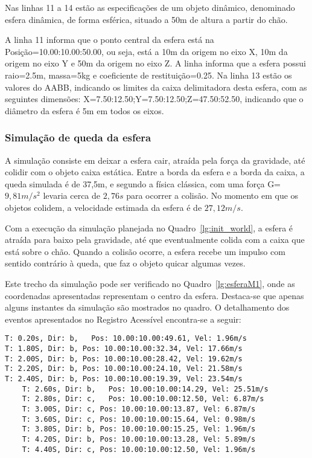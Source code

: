 \documentclass[12pt]{article}
\begin{document}
Nas linhas 11 a 14 estão as especificações de um objeto dinâmico, denominado esfera dinâmica, de forma esférica, situado a 50m de altura a partir do chão. 

A linha 11 informa que o ponto central da esfera está na Posição=10.00:10.00:50.00, ou seja, está a 10m da origem no eixo X, 10m da origem no eixo Y e 50m da origem no eixo Z. A linha informa que a esfera possui raio=2.5m, massa=5kg e coeficiente de restituição=0.25. Na linha 13 estão os valores do AABB, indicando os limites da caixa delimitadora desta esfera, com as seguintes dimensões: X=7.50:12.50;Y=7.50:12.50;Z=47.50:52.50, indicando que o diâmetro da esfera é 5m em todos os eixos.

\subsubsection{Simulação de queda da esfera}

A simulação consiste em deixar a esfera cair, atraída pela força da gravidade, até colidir com o objeto caixa estática. Entre a borda da esfera e a borda da caixa, a queda simulada é de 37,5m, e segundo a física clássica, com uma força G=$9,81 m/s^{2}$ levaria cerca de $2,76s$ para ocorrer a colisão. No momento em que os objetos colidem, a velocidade estimada da esfera é de $27,12m/s$.

Com a execução da simulação planejada no Quadro~\ref{lg:init_world}, a esfera é atraída para baixo pela gravidade, até que eventualmente colida com a caixa que está sobre o chão. Quando a colisão ocorre, a esfera recebe um impulso com sentido contrário à queda, que faz o objeto quicar algumas vezes. 

Este trecho da simulação pode ser verificado no Quadro~\ref{lg:esferaM1}, onde as coordenadas apresentadas representam o centro da esfera. Destaca-se que apenas alguns instantes da simulação são mostrados no quadro. O detalhamento dos eventos apresentados no Registro Acessível encontra-se a seguir:

\begin{lstlisting}[frame=single,caption=Registro Acessível: Queda da esfera. \label{lg:esferaM1}]
	T: 0.20s, Dir: b, 	Pos: 10.00:10.00:49.61, Vel: 1.96m/s
T: 1.80S, Dir: b, Pos: 10.00:10.00:32.34, Vel: 17.66m/s
T: 2.00S, Dir: b, Pos: 10.00:10.00:28.42, Vel: 19.62m/s
T: 2.20S, Dir: b, Pos: 10.00:10.00:24.10, Vel: 21.58m/s
T: 2.40S, Dir: b, Pos: 10.00:10.00:19.39, Vel: 23.54m/s
	T: 2.60s, Dir: b, 	Pos: 10.00:10.00:14.29, Vel: 25.51m/s
	T: 2.80s, Dir: c, 	Pos: 10.00:10.00:12.50, Vel: 6.87m/s
	T: 3.00S, Dir: c, Pos: 10.00:10.00:13.87, Vel: 6.87m/s
	T: 3.60S, Dir: c, Pos: 10.00:10.00:15.64, Vel: 0.98m/s
	T: 3.80S, Dir: b, Pos: 10.00:10.00:15.25, Vel: 1.96m/s
	T: 4.20S, Dir: b, Pos: 10.00:10.00:13.28, Vel: 5.89m/s
	T: 4.40S, Dir: c, Pos: 10.00:10.00:12.50, Vel: 1.96m/s
\end{lstlisting}
\end{document}
